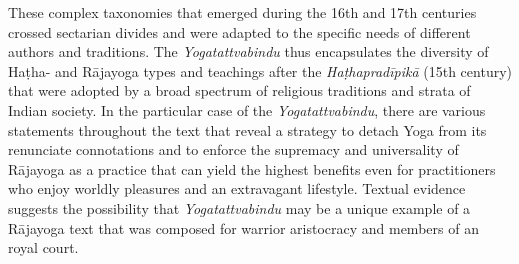 These complex taxonomies that emerged during the 16th and 17th centuries crossed sectarian divides and were adapted to the specific needs of different authors and traditions. The \textit{Yogatattvabindu} thus encapsulates the diversity of Haṭha- and Rājayoga types and teachings after the \textit{Haṭhapradīpikā} (15th century) that were adopted by a broad spectrum of religious traditions and strata of Indian society. In the particular case of the \textit{Yogatattvabindu}, there are various statements throughout the text that reveal a strategy to detach Yoga from its renunciate connotations and to enforce the supremacy and universality of Rājayoga as a practice that can yield the highest benefits even for practitioners who enjoy worldly pleasures and an extravagant lifestyle. Textual evidence suggests the possibility that \textit{Yogatattvabindu} may be a unique example of a Rājayoga text that was composed for warrior aristocracy and members of an royal court. 


